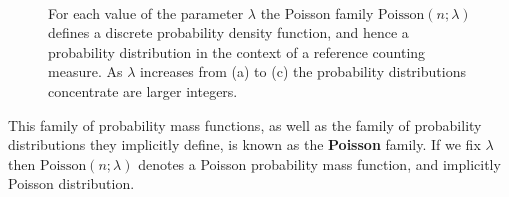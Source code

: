 \documentclass[
  letterpaper,
  DIV=11,
  numbers=noendperiod]{scrartcl}
\begin{document}
\begin{figure}
\begin{minipage}[t]{0.33\linewidth}
{{}

}

\subcaption{\label{fig-poisson2}}
\end{minipage}%
%
\begin{minipage}[t]{0.33\linewidth}

{\centering 


}

\subcaption{\label{fig-poisson3}}
\end{minipage}%
%
\begin{minipage}[t]{0.01\linewidth}

{\centering 

~

}

\end{minipage}%

\caption{\label{fig-poisson}For each value of the parameter \(\lambda\)
the Poisson family \(\mathrm{Poisson}(n; \lambda)\) defines a discrete
probability density function, and hence a probability distribution in
the context of a reference counting measure. As \(\lambda\) increases
from (a) to (c) the probability distributions concentrate are larger
integers.}

\end{figure}

This family of probability mass functions, as well as the family of
probability distributions they implicitly define, is known as the
\textbf{Poisson} family. If we fix \(\lambda\) then
\(\mathrm{Poisson}(n; \lambda)\) denotes a Poisson probability mass
function, and implicitly Poisson distribution.
\end{document}
